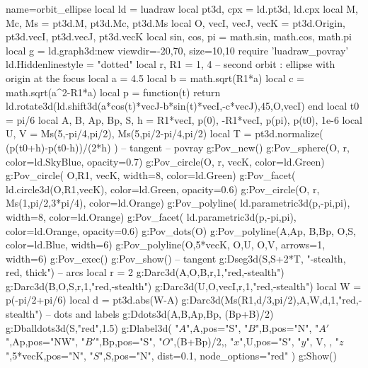 \documentclass{standalone}
\begin{document}
\begin{luadraw}{name=orbit_ellipse}
local ld = luadraw
local pt3d, cpx = ld.pt3d, ld.cpx
local M, Mc, Ms = pt3d.M, pt3d.Mc, pt3d.Ms
local O, vecI, vecJ, vecK = pt3d.Origin, pt3d.vecI, pt3d.vecJ, pt3d.vecK
local sin, cos, pi = math.sin, math.cos, math.pi
local g = ld.graph3d:new{ viewdir={-20,70}, size={10,10} }
require 'luadraw_povray'
ld.Hiddenlinestyle = "dotted"
local r, R1 = 1, 4
-- second orbit : ellipse with origin at the focus
local a = 4.5
local b = math.sqrt(R1*a)
local c = math.sqrt(a^2-R1*a)
local  p = function(t) return ld.rotate3d(ld.shift3d(a*cos(t)*vecJ-b*sin(t)*vecI,-c*vecJ),45,{O,vecI}) end
local t0 = pi/6
local A, B, Ap, Bp, S, h = R1*vecI, p(0), -R1*vecI, p(pi), p(t0), 1e-6
local U, V = Ms(5,-pi/4,pi/2), Ms(5,pi/2-pi/4,pi/2)    
local T = pt3d.normalize( (p(t0+h)-p(t0-h))/(2*h) ) -- tangent
-- povray
g:Pov_new()
g:Pov_sphere(O, r,  {color=ld.SkyBlue, opacity=0.7})
g:Pov_circle(O, r, vecK, {color=ld.Green})
g:Pov_circle( O,R1, vecK, {width=8, color=ld.Green})
g:Pov_facet( ld.circle3d(O,R1,vecK), {color=ld.Green, opacity=0.6})
g:Pov_circle(O, r, Ms(1,pi/2,3*pi/4), {color=ld.Orange})
g:Pov_polyline( ld.parametric3d(p,-pi,pi), {width=8, color=ld.Orange})
g:Pov_facet( ld.parametric3d(p,-pi,pi), {color=ld.Orange, opacity=0.6})
g:Pov_dots(O)
g:Pov_polyline({{A,Ap}, {B,Bp}, {O,S}}, {color=ld.Blue, width=6})
g:Pov_polyline({{O,5*vecK}, {O,U}, {O,V}}, {arrows=1, width=6})
g:Pov_exec()
g:Pov_show()
-- tangent
g:Dseg3d({S,S+2*T}, "-stealth, red, thick")
-- arcs
local r = 2
g:Darc3d(A,O,B,r,1,"red,-stealth")
g:Darc3d(B,O,S,r,1,"red,-stealth")
g:Darc3d(U,O,vecI,r,1,"red,-stealth")
local W = p(-pi/2+pi/6)
local d = pt3d.abs(W-A)
g:Darc3d(Ms(R1,d/3,pi/2),A,W,d,1,"red,-stealth") 
-- dots and labels   
g:Ddots3d({A,B,Ap,Bp, (Bp+B)/2})
g:Dballdots3d(S,"red",1.5)
g:Dlabel3d( "$A$",A,{pos="S"}, "$B$",B,{pos="N"}, "$A'$",Ap,{pos="NW"},
    "$B'$",Bp,{pos="S"}, "$O$",(B+Bp)/2,{}, "$x$",U,{pos="S"}, "$y$", V, {}, "$z$",5*vecK,{pos="N"}, 
    "$S$",S,{pos="N", dist=0.1, node_options="red"} )
g:Show()
\end{luadraw}
\end{document}
